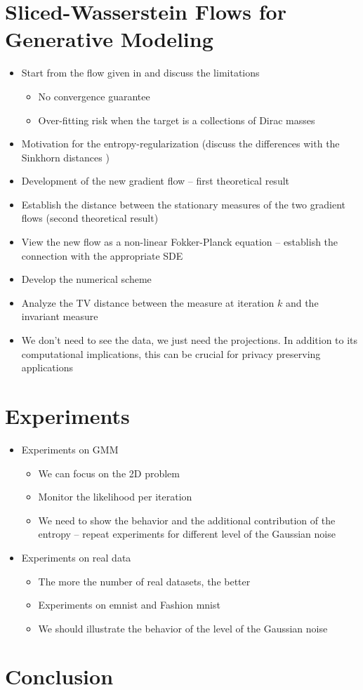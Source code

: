 \documentclass{article}
\begin{document}
\section{Sliced-Wasserstein Flows for Generative Modeling}

\begin{itemize}
\item Start from the flow given in \cite{bonnotte2013unidimensional} and discuss the limitations 
\begin{itemize}
\item No convergence guarantee
\item Over-fitting risk when the target is a collections of Dirac masses
\end{itemize}
\item Motivation for the entropy-regularization (discuss the differences with the Sinkhorn distances \cite{genevay2018learning})
\item Development of the new gradient flow -- first theoretical result
\item Establish the distance between the stationary measures of the two gradient flows (second theoretical result)
\item View the new flow as a non-linear Fokker-Planck equation -- establish the connection with the appropriate SDE
\item Develop the numerical scheme 
\item Analyze the TV distance between the measure at iteration $k$ and the invariant measure
\item We don't need to see the data, we just need the projections. In addition to its computational implications, this can be crucial for privacy preserving applications
\end{itemize}

\section{Experiments}

\begin{itemize}
\item Experiments on GMM
\begin{itemize}
\item We can focus on the 2D problem
\item Monitor the likelihood per iteration
\item We need to show the behavior and the additional contribution of the entropy -- repeat experiments for different level of the Gaussian noise
\end{itemize}
\item Experiments on real data
\begin{itemize}
\item The more the number of real datasets, the better
\item Experiments on emnist and Fashion mnist
\item We should illustrate the behavior of the level of the Gaussian noise
\end{itemize}
\end{itemize}

\section{Conclusion}





\end{document}
